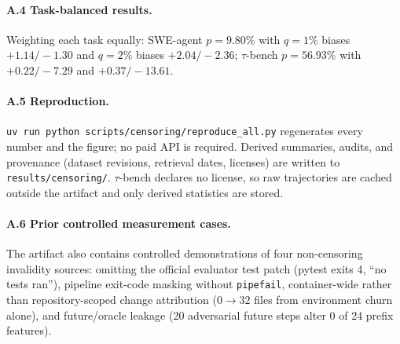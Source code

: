 \documentclass[letterpaper]{article}
\begin{document}
\paragraph{A.4 Task-balanced results.} Weighting each task equally: SWE-agent
$p=9.80\%$ with $q{=}1\%$ biases $+1.14/-1.30$ and $q{=}2\%$ biases
$+2.04/-2.36$; $\tau$-bench $p=56.93\%$ with $+0.22/-7.29$ and $+0.37/-13.61$.

\paragraph{A.5 Reproduction.} \texttt{uv run python
scripts/censoring/reproduce\_all.py} regenerates every number and the figure;
no paid API is required. Derived summaries, audits, and provenance (dataset
revisions, retrieval dates, licenses) are written to \texttt{results/censoring/}.
$\tau$-bench declares no license, so raw trajectories are cached outside the
artifact and only derived statistics are stored.

\paragraph{A.6 Prior controlled measurement cases.} The artifact also contains
controlled demonstrations of four non-censoring invalidity sources: omitting the
official evaluator test patch (pytest exits 4, ``no tests ran''), pipeline
exit-code masking without \texttt{pipefail}, container-wide rather than
repository-scoped change attribution ($0\!\to\!32$ files from environment churn
alone), and future/oracle leakage (20 adversarial future steps alter 0 of 24
prefix features).
\end{document}
